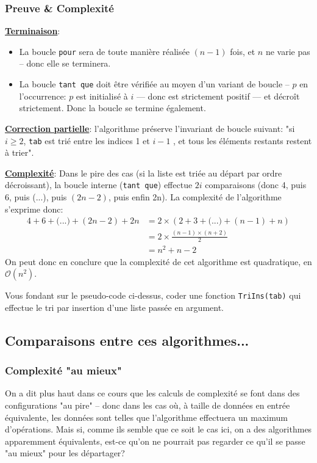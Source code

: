 \documentclass[12pt]{article}
\begin{document}
	\subsubsection*{Preuve \& Complexité}
	\textbf{\uline{Terminaison}}: 
	\begin{itemize}
		\item La boucle \texttt{pour} sera de toute manière réalisée $(n-1)$ fois, et $n$ ne varie pas -- donc elle se terminera.
		\item La boucle \texttt{tant que} doit être vérifiée au moyen d'un variant de boucle -- $p$ en l'occurrence: $p$ est initialisé à $i$ --- donc est strictement positif --- et décroît strictement. Donc la boucle se termine également.
	\end{itemize}
	
	\textbf{\uline{Correction partielle}}: l'algorithme préserve l'invariant de boucle suivant: "si $i \geq 2$, \texttt{tab} est trié entre les indices 1 et $i - 1$ , et tous les éléments restants restent à trier".
	
	\textbf{\uline{Complexité}}: Dans le pire des cas (si la liste est triée au départ par ordre décroissant), la boucle interne (\texttt{tant que}) effectue $2i$ comparaisons (donc 4, puis 6, puis (...), puis $(2n - 2)$, puis enfin 2n). La complexité de l'algorithme s'exprime donc:
	\begin{align*}
	4 + 6 + \text{(...)} + (2n-2) + 2n &= 2 \times (2 + 3 + \text{(...)} + (n-1) + n) \\
	&= 2 \times \frac{(n-1)\times (n+2)}{2} \\
	&= n^2 + n - 2
	\end{align*}
	On peut donc en conclure que la complexité de cet algorithme est quadratique, en $\mathcal{O}(n^2)$.
	
	\begin{MonExo}
		Vous fondant sur le pseudo-code ci-dessus, coder une fonction \texttt{TriIns(tab)} qui effectue le tri par insertion d'une liste passée en argument.
	\end{MonExo}
	\begin{MaReponse}
	\end{MaReponse}
	
	\subsection{Comparaisons entre ces algorithmes...}
	\subsubsection*{Complexité "au mieux"}
	On a dit plus haut dans ce cours que les calculs de complexité se font dans des configurations "au pire" -- donc dans les cas où, à taille de données en entrée équivalente, les données sont telles que l'algorithme effectuera un maximum d'opérations. Mais si, comme ils semble que ce soit le cas ici, on a des algorithmes apparemment équivalents, est-ce qu'on ne pourrait pas regarder ce qu'il se passe "au mieux" pour les départager?
	
\end{document}
